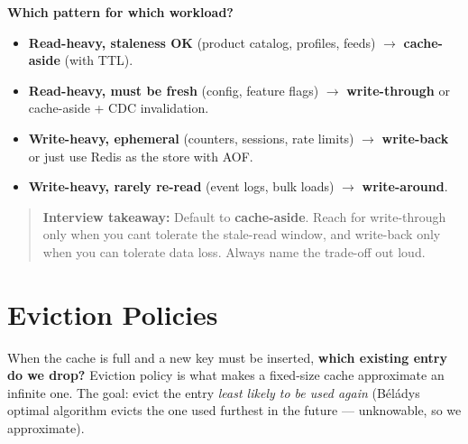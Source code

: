 \documentclass[11pt]{article}
\providecommand{\tightlist}{\setlength{\itemsep}{1pt}\setlength{\parskip}{0pt}}
\begin{document}
\textbf{Which pattern for which workload?}

\begin{itemize}
\tightlist
\item
  \textbf{Read-heavy, staleness OK} (product catalog, profiles, feeds) \(\rightarrow\) \textbf{cache-aside} (with TTL).
\item
  \textbf{Read-heavy, must be fresh} (config, feature flags) \(\rightarrow\) \textbf{write-through} or cache-aside + CDC invalidation.
\item
  \textbf{Write-heavy, ephemeral} (counters, sessions, rate limits) \(\rightarrow\) \textbf{write-back} or just use Redis as the store with AOF.
\item
  \textbf{Write-heavy, rarely re-read} (event logs, bulk loads) \(\rightarrow\) \textbf{write-around}.
\end{itemize}

\begin{quote}
\textbf{Interview takeaway:} Default to \textbf{cache-aside}. Reach for write-through only when you can\textquotesingle t tolerate the stale-read window, and write-back only when you can tolerate data loss. Always name the trade-off out loud.
\end{quote}

\section{Eviction Policies}\label{eviction-policies}

When the cache is full and a new key must be inserted, \textbf{which existing entry do we drop?} Eviction policy is what makes a fixed-size cache approximate an infinite one. The goal: evict the entry \emph{least likely to be used again} (Bélády\textquotesingle s optimal algorithm evicts the one used furthest in the future --- unknowable, so we approximate).
\end{document}
